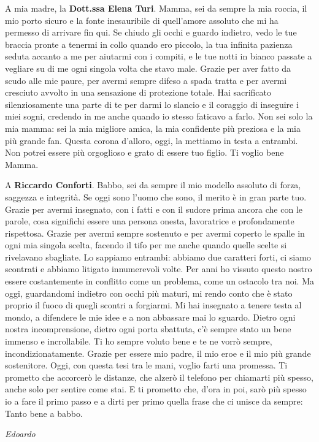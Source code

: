 \vspace{1em}

\noindent
A mia madre, la \textbf{Dott.ssa Elena Turi}.
Mamma, sei da sempre la mia roccia, il mio porto sicuro e la fonte inesauribile di quell’amore assoluto che mi ha permesso di arrivare fin qui. Se chiudo gli occhi e guardo indietro, vedo le tue braccia pronte a tenermi in collo quando ero piccolo, la tua infinita pazienza seduta accanto a me per aiutarmi con i compiti, e le tue notti in bianco passate a vegliare su di me ogni singola volta che stavo male. Grazie per aver fatto da scudo alle mie paure, per avermi sempre difeso a spada tratta e per avermi cresciuto avvolto in una sensazione di protezione totale. Hai sacrificato silenziosamente una parte di te per darmi lo slancio e il coraggio di inseguire i miei sogni, credendo in me anche quando io stesso faticavo a farlo. Non sei solo la mia mamma: sei la mia migliore amica, la mia confidente più preziosa e la mia più grande fan. Questa corona d'alloro, oggi, la mettiamo in testa a entrambi. Non potrei essere più orgoglioso e grato di essere tuo figlio. Ti voglio bene Mamma.

\vspace{1em}

\noindent
A \textbf{Riccardo Conforti}.
Babbo, sei da sempre il mio modello assoluto di forza, saggezza e integrità. Se oggi sono l'uomo che sono, il merito è in gran parte tuo. Grazie per avermi insegnato, con i fatti e con il sudore prima ancora che con le parole, cosa significhi essere una persona onesta, lavoratrice e profondamente rispettosa. Grazie per avermi sempre sostenuto e per avermi coperto le spalle in ogni mia singola scelta, facendo il tifo per me anche quando quelle scelte si rivelavano sbagliate.
Lo sappiamo entrambi: abbiamo due caratteri forti, ci siamo scontrati e abbiamo litigato innumerevoli volte. Per anni ho vissuto questo nostro essere costantemente in conflitto come un problema, come un ostacolo tra noi. Ma oggi, guardandomi indietro con occhi più maturi, mi rendo conto che è stato proprio il fuoco di quegli scontri a forgiarmi. Mi hai insegnato a tenere testa al mondo, a difendere le mie idee e a non abbassare mai lo sguardo. Dietro ogni nostra incomprensione, dietro ogni porta sbattuta, c'è sempre stato un bene immenso e incrollabile. Ti ho sempre voluto bene e te ne vorrò sempre, incondizionatamente.
Grazie per essere mio padre, il mio eroe e il mio più grande sostenitore. Oggi, con questa tesi tra le mani, voglio farti una promessa. Ti prometto che accorcerò le distanze, che alzerò il telefono per chiamarti più spesso, anche solo per sentire come stai. E ti prometto che, d'ora in poi, sarò più spesso io a fare il primo passo e a dirti per primo quella frase che ci unisce da sempre: Tanto bene a babbo.

\vspace{2mm}
\begin{flushright}
    \textit{Edoardo}
\end{flushright}